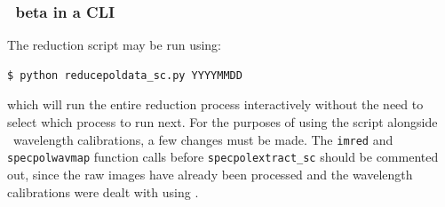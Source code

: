 


\subsubsection{\polsalt\ beta in a \gls{CLI}}

The reduction script may be run using:
\begin{lstlisting}[language=bash]
$ python reducepoldata_sc.py YYYYMMDD
\end{lstlisting}
{\parskip=0pt which} will run the entire reduction process interactively without the need to select which process to run next. For the purposes of using the script alongside \iraf\ wavelength calibrations, a few changes must be made. The \texttt{imred} and \texttt{specpolwavmap} function calls before \texttt{specpolextract\_sc} should be commented out, since the raw images have already been processed and the wavelength calibrations were dealt with using \iraf.

